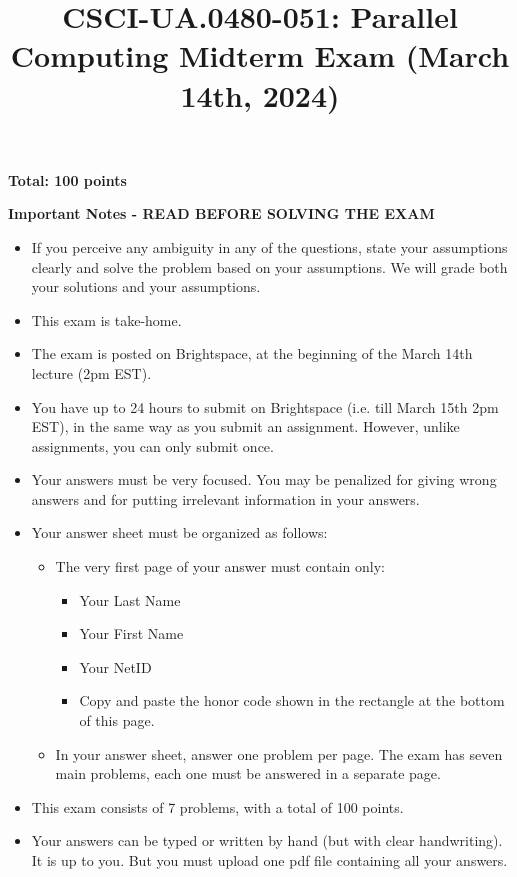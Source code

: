 \documentclass{article}
\title{CSCI-UA.0480-051: Parallel Computing Midterm Exam (March 14th, 2024)}
\author{}
\date{}
\begin{document}
\maketitle

\textbf{Total: 100 points}

\textbf{Important Notes - READ BEFORE SOLVING THE EXAM}

\begin{itemize}
    \item If you perceive any ambiguity in any of the questions, state your assumptions clearly and solve the problem based on your assumptions. We will grade both your solutions and your assumptions.
    \item This exam is take-home.
    \item The exam is posted on Brightspace, at the beginning of the March 14th lecture (2pm EST).
    \item You have up to 24 hours to submit on Brightspace (i.e. till March 15th 2pm EST), in the same way as you submit an assignment. However, unlike assignments, you can only submit once.
    \item Your answers must be very focused. You may be penalized for giving wrong answers and for putting irrelevant information in your answers.
    \item Your answer sheet must be organized as follows:
    \begin{itemize}
        \item The very first page of your answer must contain only:
        \begin{itemize}
            \item Your Last Name
            \item Your First Name
            \item Your NetID
            \item Copy and paste the honor code shown in the rectangle at the bottom of this page.
        \end{itemize}
        \item In your answer sheet, answer one problem per page. The exam has seven main problems, each one must be answered in a separate page.
    \end{itemize}
    \item This exam consists of 7 problems, with a total of 100 points.
    \item Your answers can be typed or written by hand (but with clear handwriting). It is up to you. But you must upload one pdf file containing all your answers.
\end{itemize}
\end{document}
